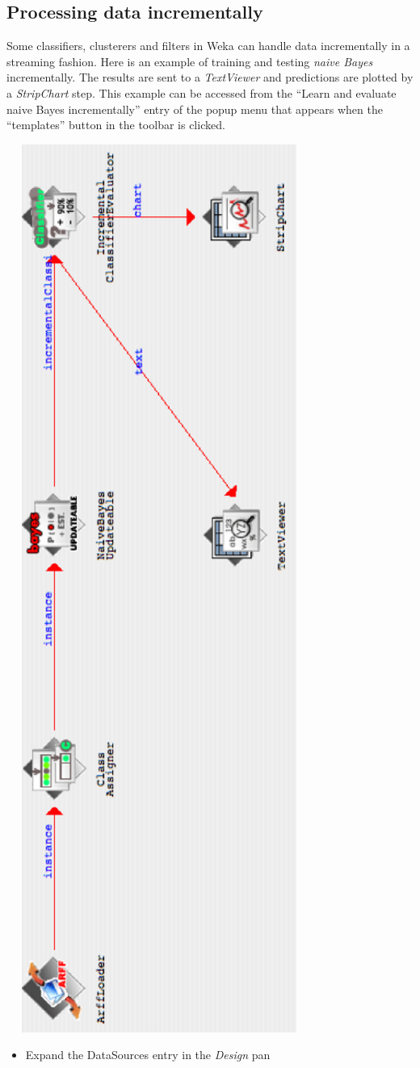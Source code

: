 \newpage
\subsection{Processing data incrementally}

Some classifiers, clusterers and filters in Weka can handle data
incrementally in a streaming fashion. Here is an example of training
and testing \textit{naive Bayes} incrementally. The results are sent
to a \textit{TextViewer} and predictions are plotted by a
\textit{StripChart} step. This example can be accessed from the
``Learn and evaluate naive Bayes incrementally'' entry of the popup menu that
appears when the ``templates'' button in the toolbar is clicked.

\begin{center}
  \includegraphics[angle=270,width=10cm]{images/knowledgeflow/IncrementalFlow.eps}
\end{center}

\begin{itemize}
        \item Expand the DataSources entry in the \textit{Design}
          pan
\end{itemize}
